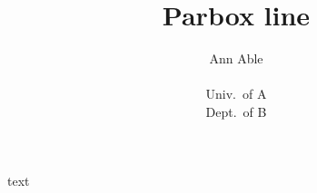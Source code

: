 \documentclass{article}
\begin{document}
\title{Parbox line}
\author{Ann Able \\ \parbox{5cm}{\centering Univ.\ of A\\ Dept.\ of B}}
\date{}
\maketitle
text
\end{document}
